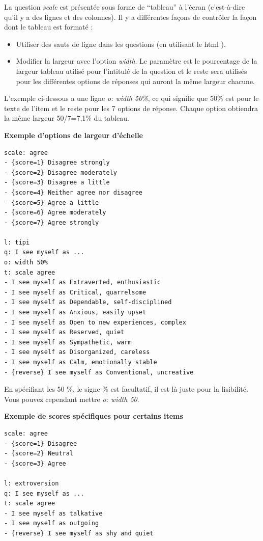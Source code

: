 \documentclass[
]{book}
\providecommand{\tightlist}{%
  \setlength{\itemsep}{0pt}\setlength{\parskip}{0pt}}
\begin{document}
La question \emph{scale} est présentée sous forme de ``tableau'' à
l'écran (c'est-à-dire qu'il y a des lignes et des colonnes). Il y a
différentes façons de contrôler la façon dont le tableau est formaté :

\begin{itemize}
\tightlist
\item
  Utiliser des sauts de ligne dans les questions (en utilisant le html
  ).
\item
  Modifier la largeur avec l'option \emph{width}. Le paramètre est le
  pourcentage de la largeur tableau utilisé pour l'intitulé de la
  question et le reste sera utilisés pour les différentes options de
  réponses qui auront la même largeur chacune.
\end{itemize}

L'exemple ci-dessous a une ligne \emph{o: width 50\%}, ce qui signifie
que 50\% est pour le texte de l'item et le reste pour les 7 options de
réponse. Chaque option obtiendra la même largeur 50/7=7,1\% du tableau.

\textbf{Exemple d'options de largeur d'échelle}

\begin{verbatim}
scale: agree
- {score=1} Disagree strongly
- {score=2} Disagree moderately
- {score=3} Disagree a little
- {score=4} Neither agree nor disagree
- {score=5} Agree a little
- {score=6} Agree moderately
- {score=7} Agree strongly

l: tipi
q: I see myself as ...
o: width 50%
t: scale agree
- I see myself as Extraverted, enthusiastic
- I see myself as Critical, quarrelsome
- I see myself as Dependable, self-disciplined
- I see myself as Anxious, easily upset
- I see myself as Open to new experiences, complex
- I see myself as Reserved, quiet
- I see myself as Sympathetic, warm
- I see myself as Disorganized, careless
- I see myself as Calm, emotionally stable
- {reverse} I see myself as Conventional, uncreative
\end{verbatim}

En spécifiant les 50 \%, le signe \% est facultatif, il est là juste
pour la lisibilité. Vous pouvez cependant mettre \emph{o: width 50}.

\textbf{Exemple de scores spécifiques pour certains items}

\begin{verbatim}
scale: agree
- {score=1} Disagree
- {score=2} Neutral
- {score=3} Agree

l: extroversion
q: I see myself as ...
t: scale agree
- I see myself as talkative
- I see myself as outgoing
- {reverse} I see myself as shy and quiet
\end{verbatim}
\end{document}
